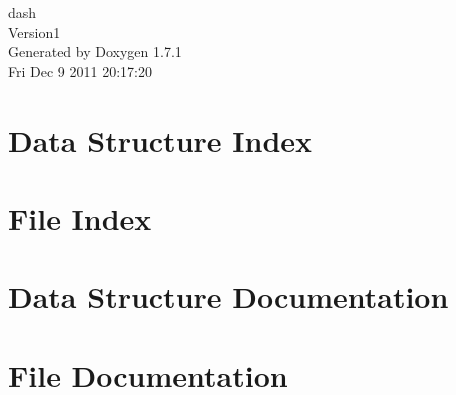 \documentclass[a4paper]{book}
\begin{document}
\hypersetup{pageanchor=false}
\begin{titlepage}
\vspace*{7cm}
\begin{center}
{\Large dash \\[1ex]\large Version1 }\\
\vspace*{1cm}
{\large Generated by Doxygen 1.7.1}\\
\vspace*{0.5cm}
{\small Fri Dec 9 2011 20:17:20}\\
\end{center}
\end{titlepage}
\clearemptydoublepage
{}
\tableofcontents
\clearemptydoublepage
{}
\hypersetup{pageanchor=true}
\chapter{Data Structure Index}

\chapter{File Index}

\chapter{Data Structure Documentation}





\chapter{File Documentation}
























\printindex
\end{document}
